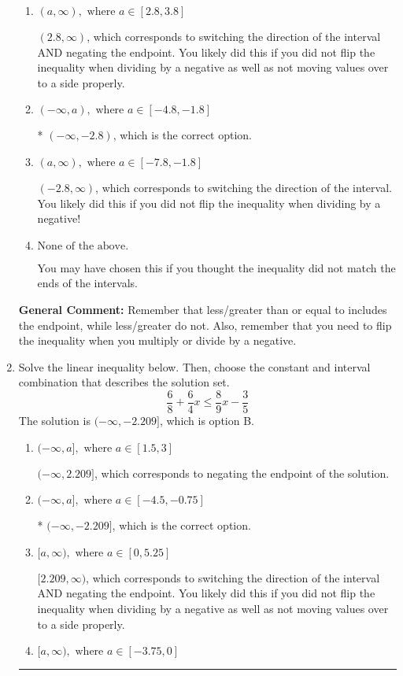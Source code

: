 \documentclass{extbook}[14pt]
\newcommand{\litem}[1]{\item #1

\rule{\textwidth}{0.4pt}}
\begin{document}
\begin{enumerate}
{\begin{enumerate}[label=\Alph*.]
 $(-\infty, 2.8)$, which corresponds to negating the endpoint of the solution.
\item \( (a, \infty), \text{ where } a \in [2.8, 3.8] \)

 $(2.8, \infty)$, which corresponds to switching the direction of the interval AND negating the endpoint. You likely did this if you did not flip the inequality when dividing by a negative as well as not moving values over to a side properly.
\item \( (-\infty, a), \text{ where } a \in [-4.8, -1.8] \)

* $(-\infty, -2.8)$, which is the correct option.
\item \( (a, \infty), \text{ where } a \in [-7.8, -1.8] \)

 $(-2.8, \infty)$, which corresponds to switching the direction of the interval. You likely did this if you did not flip the inequality when dividing by a negative!
\item \( \text{None of the above}. \)

You may have chosen this if you thought the inequality did not match the ends of the intervals.
\end{enumerate}

\textbf{General Comment:} Remember that less/greater than or equal to includes the endpoint, while less/greater do not. Also, remember that you need to flip the inequality when you multiply or divide by a negative.
}
\litem{
Solve the linear inequality below. Then, choose the constant and interval combination that describes the solution set.
\[ \frac{6}{8} + \frac{6}{4} x \leq \frac{8}{9} x - \frac{3}{5} \]The solution is \( (-\infty, -2.209] \), which is option B.\begin{enumerate}[label=\Alph*.]
\item \( (-\infty, a], \text{ where } a \in [1.5, 3] \)

 $(-\infty, 2.209]$, which corresponds to negating the endpoint of the solution.
\item \( (-\infty, a], \text{ where } a \in [-4.5, -0.75] \)

* $(-\infty, -2.209]$, which is the correct option.
\item \( [a, \infty), \text{ where } a \in [0, 5.25] \)

 $[2.209, \infty)$, which corresponds to switching the direction of the interval AND negating the endpoint. You likely did this if you did not flip the inequality when dividing by a negative as well as not moving values over to a side properly.
\item \( [a, \infty), \text{ where } a \in [-3.75, 0] \)


\end{enumerate}}
\end{enumerate}
\end{document}
